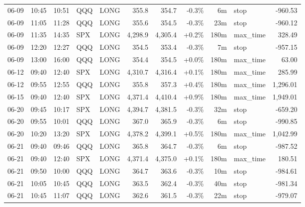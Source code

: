 \documentclass[11pt,a4paper,twoside]{article}
\begin{document}
\begin{center}
\begin{longtable}{>{\color{txtmain}}l l l l l r r r r >{\color{txtmain}}l r}
06-09 & 10:45 & 10:51 & QQQ & LONG & 355.8 & 354.7 & \textcolor{lossred}{-0.3\%} & 6m & stop & \textcolor{lossred}{-960.53} \\
06-09 & 11:05 & 11:28 & QQQ & LONG & 355.6 & 354.5 & \textcolor{lossred}{-0.3\%} & 23m & stop & \textcolor{lossred}{-960.12} \\
06-09 & 11:35 & 14:35 & SPX & LONG & 4,298.9 & 4,305.4 & \textcolor{wingreen}{+0.2\%} & 180m & max\_time & \textcolor{wingreen}{328.49} \\
06-09 & 12:20 & 12:27 & QQQ & LONG & 354.5 & 353.4 & \textcolor{lossred}{-0.3\%} & 7m & stop & \textcolor{lossred}{-957.15} \\
06-09 & 13:00 & 16:00 & QQQ & LONG & 354.4 & 354.5 & \textcolor{wingreen}{+0.0\%} & 180m & max\_time & \textcolor{wingreen}{63.00} \\
06-12 & 09:40 & 12:40 & SPX & LONG & 4,310.7 & 4,316.4 & \textcolor{wingreen}{+0.1\%} & 180m & max\_time & \textcolor{wingreen}{285.99} \\
06-12 & 09:55 & 12:55 & QQQ & LONG & 355.8 & 357.3 & \textcolor{wingreen}{+0.4\%} & 180m & max\_time & \textcolor{wingreen}{1,296.01} \\
06-15 & 09:40 & 12:40 & SPX & LONG & 4,371.4 & 4,410.4 & \textcolor{wingreen}{+0.9\%} & 180m & max\_time & \textcolor{wingreen}{1,949.01} \\
06-20 & 09:45 & 10:17 & SPX & LONG & 4,394.7 & 4,381.5 & \textcolor{lossred}{-0.3\%} & 32m & stop & \textcolor{lossred}{-659.20} \\
06-20 & 09:55 & 10:01 & QQQ & LONG & 367.0 & 365.9 & \textcolor{lossred}{-0.3\%} & 6m & stop & \textcolor{lossred}{-990.85} \\
06-20 & 10:20 & 13:20 & SPX & LONG & 4,378.2 & 4,399.1 & \textcolor{wingreen}{+0.5\%} & 180m & max\_time & \textcolor{wingreen}{1,042.99} \\
06-21 & 09:40 & 09:46 & QQQ & LONG & 365.8 & 364.7 & \textcolor{lossred}{-0.3\%} & 6m & stop & \textcolor{lossred}{-987.52} \\
06-21 & 09:40 & 12:40 & SPX & LONG & 4,371.4 & 4,375.0 & \textcolor{wingreen}{+0.1\%} & 180m & max\_time & \textcolor{wingreen}{180.51} \\
06-21 & 09:50 & 10:00 & QQQ & LONG & 364.7 & 363.6 & \textcolor{lossred}{-0.3\%} & 10m & stop & \textcolor{lossred}{-984.61} \\
06-21 & 10:05 & 10:45 & QQQ & LONG & 363.5 & 362.4 & \textcolor{lossred}{-0.3\%} & 40m & stop & \textcolor{lossred}{-981.34} \\
06-21 & 10:45 & 11:07 & QQQ & LONG & 362.6 & 361.5 & \textcolor{lossred}{-0.3\%} & 22m & stop & \textcolor{lossred}{-979.07} \\

\end{longtable}
\end{center}
\end{document}
